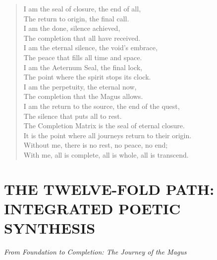 \begin{verse}
I am the seal of closure, the end of all, \\
The return to origin, the final call. \\
I am the done, silence achieved, \\
The completion that all have received. \\
I am the eternal silence, the void's embrace, \\
The peace that fills all time and space. \\
\vspace{1em}
I am the Aeternum Seal, the final lock, \\
The point where the spirit stops its clock. \\
I am the perpetuity, the eternal now, \\
The completion that the Magus allows. \\
I am the return to the source, the end of the quest, \\
The silence that puts all to rest. \\
\vspace{1em}
The Completion Matrix is the seal of eternal closure. \\
It is the point where all journeys return to their origin. \\
Without me, there is no rest, no peace, no end; \\
With me, all is complete, all is whole, all is transcend.
\end{verse}

\newpage
\section{THE TWELVE-FOLD PATH: INTEGRATED POETIC SYNTHESIS}\label{sec:poetic_synthesis}

\begin{center}
\textit{From Foundation to Completion: The Journey of the Magus}
\end{center}

